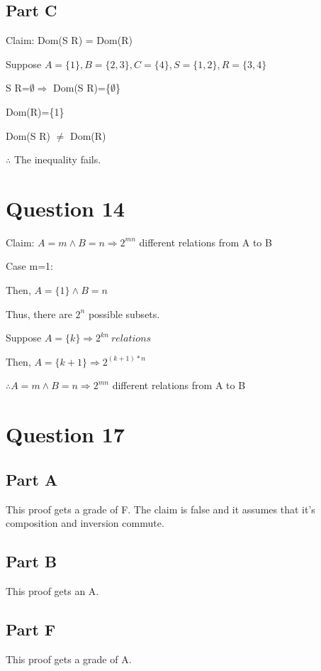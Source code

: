 \documentclass{article}
\begin{document}
\subsection*{Part C}

Claim: Dom(S \textopenbullet R) = Dom(R)

Suppose $A=\{1\}, B=\{2,3\}, C=\{4\}, S=\{1,2\}, R=\{3,4\} $

S \textopenbullet R=$\emptyset \Rightarrow$ Dom(S \textopenbullet R)=\{$\emptyset$\}

Dom(R)=\{1\}

Dom(S \textopenbullet R) $\neq$ Dom(R)

$\therefore$ The inequality fails.

\section*{Question 14}

Claim: $A=m \wedge B=n \Rightarrow 2^{mn}$ different relations from A to B

Case m=1:

Then, $A=\{1\} \wedge B=n$

Thus, there are $2^n$ possible subsets.

Suppose $A=\{k\} \Rightarrow 2^{kn} \ relations$

Then, $A=\{k+1\} \Rightarrow 2^{(k+1)*n}$

$\therefore A=m \wedge B=n \Rightarrow 2^{mn} $ different relations from A to B

\section*{Question 17}
\subsection*{Part A}

This proof gets a grade of F. The claim is false and it assumes that it's composition and inversion commute. 

\subsection*{Part B}

This proof gets an A.

\subsection*{Part F}
This proof gets a grade of A.
\end{document}

